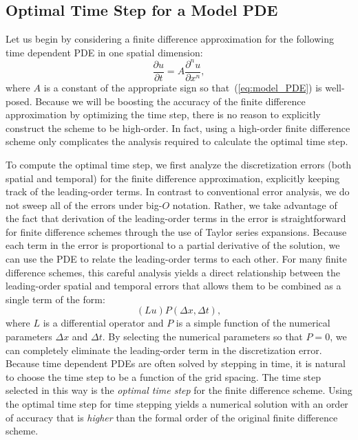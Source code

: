 \documentclass[fleqn,12pt,twoside]{article}
\newcommand{\beq}{\begin{equation}}
\newcommand{\eeq}{\end{equation}}
\def\dt{\Delta t}
\def\dx{\Delta x}
\begin{document}
\subsection{\label{sec:ots_model_pde} 
            Optimal Time Step for a Model PDE}
Let us begin by considering a finite difference approximation for the
following time dependent PDE in one spatial dimension: 
\beq
  \frac{\partial u}{\partial t} = A \frac{\partial^n u}{\partial x^n},
  \label{eq:model_PDE}
\eeq
where $A$ is a constant of the appropriate sign so that~(\ref{eq:model_PDE}) 
is well-posed.  Because we will be boosting the accuracy of the finite 
difference approximation by optimizing the time step, there is no reason to 
explicitly construct the scheme to be high-order.  In fact, using a high-order 
finite difference scheme only complicates the analysis required to calculate 
the optimal time step.  

To compute the optimal time step, we first analyze the discretization errors 
(both spatial and temporal) for the finite difference approximation, 
explicitly keeping track of the leading-order terms.  In contrast to 
conventional error analysis, we do not sweep all of the errors under big-$O$
notation.  Rather, we take advantage of the fact that derivation of the 
leading-order terms in the error is straightforward for finite difference
schemes through the use of Taylor series expansions.  Because each term in 
the error is proportional to a partial derivative of the solution, we can 
use the PDE to relate the leading-order terms to each other.  
For many finite difference schemes, this careful analysis yields a direct 
relationship between the leading-order spatial and temporal errors that allows 
them to be combined as a single term of the form:
\beq
  (L u) P(\dx, \dt) ,
  \label{eq:leading_order_error_model_PDE_general}
\eeq
where $L$ is a differential operator and $P$ is a simple function of the 
numerical parameters $\dx$ and $\dt$.  By selecting the numerical parameters 
so that $P = 0$, we can completely eliminate the leading-order term in the 
discretization error.  Because time dependent PDEs are often solved by 
stepping in time, it is natural to choose the time step to be a function of 
the grid spacing.  The time step selected in this way is the
\emph{optimal time step} for the finite difference scheme.  Using the optimal
time step for time stepping yields a numerical solution with an order 
of accuracy that is \emph{higher} than the formal order of the original finite 
difference scheme.
\end{document}
